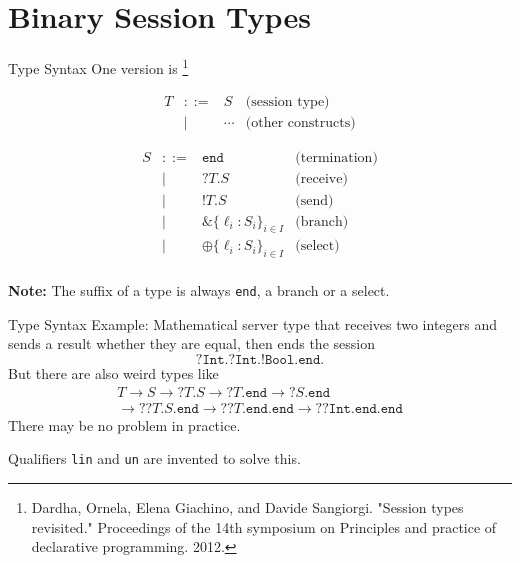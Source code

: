 \section{Binary Session Types}

\begin{frame}{Type Syntax}
  One version is \footnote{Dardha, Ornela, Elena Giachino, and Davide Sangiorgi. "Session types revisited." Proceedings of the 14th symposium on Principles and practice of declarative programming. 2012.}
  \begin{center}
    \begin{minipage}{0.48\textwidth}
      $$\begin{array}{lclr}
          T & ::= & S      & \text{(session type)}     \\
            & |   & \cdots & \text{(other constructs)}
        \end{array}$$
    \end{minipage}
    \hfill
    \begin{minipage}{0.48\textwidth}
      $$\begin{array}{lclr}
          S & ::= & \texttt{end}                  & \text{(termination)} \\
            & |   & ?T.S                          & \text{(receive)}     \\
            & |   & !T.S                          & \text{(send)}        \\
            & |   & \&\{\ell_i:S_i\}_{i\in I}     & \text{(branch)}      \\
            & |   & \oplus\{\ell_i:S_i\}_{i\in I} & \text{(select)}      \\
        \end{array}$$
    \end{minipage}
  \end{center}
  \textbf{Note:} The suffix of a type is always \texttt{end}, a branch or a select.
\end{frame}

\begin{frame}{Type Syntax}
  Example: Mathematical server type that receives two integers and sends a result whether they are equal, then ends the session
  $$?\texttt{Int}.?\texttt{Int}.!\texttt{Bool}.\texttt{end}.$$
  But there are also weird types like
  \begin{align*}
    T \longrightarrow S \longrightarrow ?T.S \longrightarrow ?T.\texttt{end} \longrightarrow ?S.\texttt{end} \\
    \longrightarrow ??T.S.\texttt{end} \longrightarrow ??T.\texttt{end}.\texttt{end} \longrightarrow ??\texttt{Int}.\texttt{end}.\texttt{end}
  \end{align*}
  There may be no problem in practice.

  Qualifiers \texttt{lin} and \texttt{un} are invented to solve this.
\end{frame}

